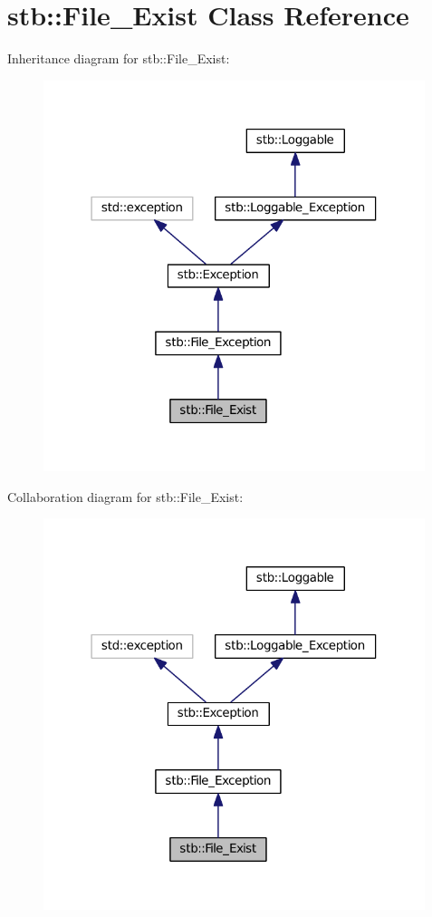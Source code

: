 \hypertarget{classstb_1_1File__Exist}{\section{stb\+:\+:File\+\_\+\+Exist Class Reference}
\label{classstb_1_1File__Exist}
}


Inheritance diagram for stb\+:\+:File\+\_\+\+Exist\+:
\nopagebreak
\begin{figure}[H]
\begin{center}
\leavevmode
\includegraphics[width=316pt]{classstb_1_1File__Exist__inherit__graph}
\end{center}
\end{figure}


Collaboration diagram for stb\+:\+:File\+\_\+\+Exist\+:
\nopagebreak
\begin{figure}[H]
\begin{center}
\leavevmode
\includegraphics[width=316pt]{classstb_1_1File__Exist__coll__graph}
\end{center}
\end{figure}
